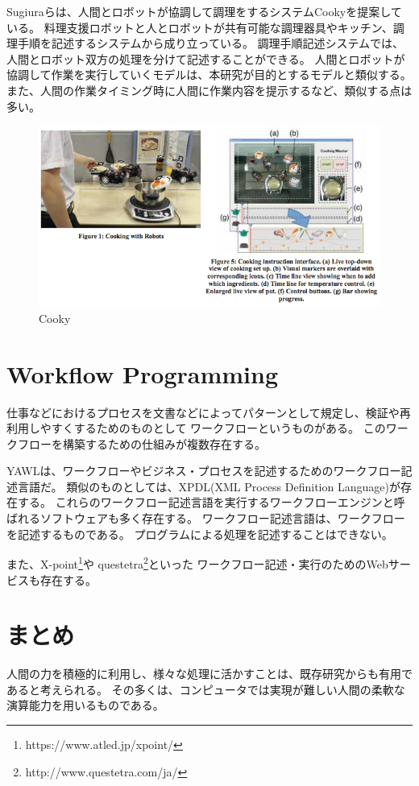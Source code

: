 \mbox{}

Sugiuraらは、人間とロボットが協調して調理をするシステムCooky\cite{cooky}を提案している。
料理支援ロボットと人とロボットが共有可能な調理器具やキッチン、調理手順を記述するシステムから成り立っている。
調理手順記述システムでは、人間とロボット双方の処理を分けて記述することができる。
人間とロボットが協調して作業を実行していくモデルは、本研究が目的とするモデルと類似する。
また、人間の作業タイミング時に人間に作業内容を提示するなど、類似する点は多い。

\begin{figure}[htbp]
  \begin{center}
  \includegraphics[width=.6\linewidth,bb=0 0 633 336]{images/cooky.png}
  \end{center}
  \caption{Cooky}
  \label{fig:cooky}
\end{figure}

\section{Workflow Programming}\label{workflow-programming}

仕事などにおけるプロセスを文書などによってパターンとして規定し、検証や再利用しやすくするためのものとして
ワークフローというものがある。
このワークフローを構築するための仕組みが複数存在する。

YAWL\cite{yawl}は、ワークフローやビジネス・プロセスを記述するためのワークフロー記述言語だ。
類似のものとしては、XPDL(XML Process Definition
Language)\cite{xpdl}が存在する。
これらのワークフロー記述言語を実行するワークフローエンジンと呼ばれるソフトウェアも多く存在する。
ワークフロー記述言語は、ワークフローを記述するものである。
プログラムによる処理を記述することはできない。

また、X-point\footnote{https://www.atled.jp/xpoint/}や
questetra\footnote{http://www.questetra.com/ja/}といった
ワークフロー記述・実行のためのWebサービスも存在する。

\section{まとめ}\label{ux307eux3068ux3081}

人間の力を積極的に利用し、様々な処理に活かすことは、既存研究からも有用であると考えられる。
その多くは、コンピュータでは実現が難しい人間の柔軟な演算能力を用いるものである。

